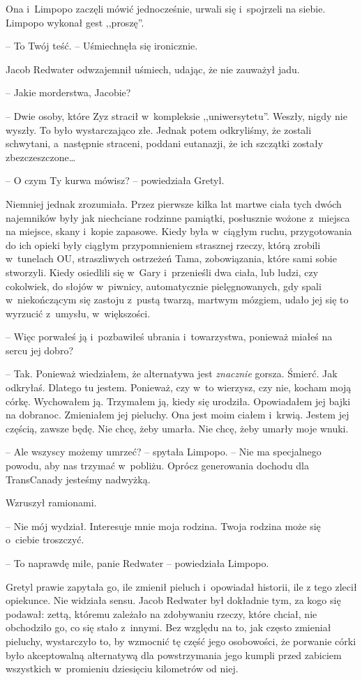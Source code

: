 \documentclass[oneside,polish,11pt,sfheadings]{mwbk}
\begin{document}
Ona i~Limpopo zaczęli mówić jednocześnie, urwali się i~spojrzeli na
siebie. Limpopo wykonał gest ,,proszę''. 

-- To Twój teść. -- Uśmiechnęła
się ironicznie.

Jacob Redwater odwzajemnił uśmiech, udając, że nie zauważył jadu.

-- Jakie morderstwa, Jacobie?

-- Dwie osoby, które Zyz stracił w~kompleksie ,,uniwersytetu''. Weszły,
nigdy nie wyszły. To było wystarczająco złe. Jednak potem odkryliśmy, że
zostali schwytani, a~następnie straceni, poddani eutanazji, że ich
szczątki zostały zbezczeszczone\ldots 

-- O czym Ty kurwa mówisz? -- powiedziała Gretyl. 

Niemniej jednak
zrozumiała. Przez pierwsze kilka lat martwe ciała tych dwóch najemników
były jak niechciane rodzinne pamiątki, posłusznie wożone z~miejsca na
miejsce, skany i~kopie zapasowe. Kiedy była w~ciągłym ruchu,
przygotowania do ich opieki były ciągłym przypomnieniem strasznej
rzeczy, którą zrobili w~tunelach OU, straszliwych ostrzeżeń Tama,
zobowiązania, które sami sobie stworzyli. Kiedy osiedlili się w~Gary i~przenieśli dwa ciała, lub ludzi, czy cokolwiek, do słojów w~piwnicy,
automatycznie pielęgnowanych, gdy spali w~niekończącym się zastoju z~pustą twarzą, martwym mózgiem, udało jej się to wyrzucić z~umysłu, w~większości.

-- Więc porwałeś ją i~pozbawiłeś ubrania i~towarzystwa, ponieważ miałeś
na sercu jej dobro?

-- Tak. Ponieważ wiedziałem, że alternatywa jest \textit{znacznie} gorsza.
Śmierć. Jak odkryłaś. Dlatego tu jestem. Ponieważ, czy w~to wierzysz,
czy nie, kocham moją córkę. Wychowałem ją. Trzymałem ją, kiedy się
urodziła. Opowiadałem jej bajki na dobranoc. Zmieniałem jej pieluchy.
Ona jest moim ciałem i~krwią. Jestem jej częścią, zawsze będę. Nie chcę,
żeby umarła. Nie chcę, żeby umarły moje wnuki.

-- Ale wszyscy możemy umrzeć? -- spytała Limpopo. -- Nie ma specjalnego
powodu, aby nas trzymać w~pobliżu. Oprócz generowania dochodu dla
TransCanady jesteśmy nadwyżką.

Wzruszył ramionami. 

-- Nie mój wydział. Interesuje mnie moja rodzina.
Twoja rodzina może się o~ciebie troszczyć.

-- To naprawdę miłe, panie Redwater -- powiedziała Limpopo.

Gretyl prawie zapytała go, ile zmienił pieluch i~opowiadał historii, ile
z tego zlecił opiekunce. Nie widziała sensu. Jacob Redwater był
dokładnie tym, za kogo się podawał: zettą, któremu zależało na
zdobywaniu rzeczy, które chciał, nie obchodziło go, co się stało z~innymi. Bez względu na to, jak często zmieniał pieluchy, wystarczyło to,
by wzmocnić tę część jego osobowości, że porwanie córki było
akceptowalną alternatywą dla powstrzymania jego kumpli przed zabiciem
wszystkich w~promieniu dziesięciu kilometrów od niej.
\end{document}
